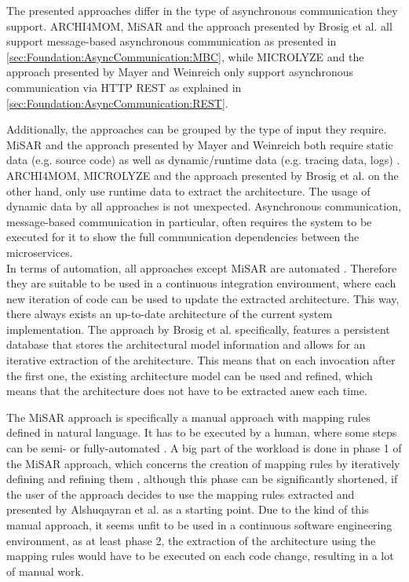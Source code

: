 The presented approaches differ in the type of asynchronous communication they support.
ARCHI4MOM, MiSAR and the approach presented by Brosig et al. all support message-based asynchronous communication as presented in \autoref{sec:Foundation:AsyncCommunication:MBC}, while MICROLYZE and the approach presented by Mayer and Weinreich only support asynchronous communication via HTTP REST as explained in \autoref{sec:Foundation:AsyncCommunication:REST}.

Additionally, the approaches can be grouped by the type of input they require.
MiSAR and the approach presented by Mayer and Weinreich both require static data (e.g. source code) as well as dynamic/runtime data (e.g. tracing data, logs) \cite{Alshuqayran2018MiSAR,Mayer2018}.
ARCHI4MOM, MICROLYZE and the approach presented by Brosig et al. on the other hand, only use runtime data to extract the architecture.
The usage of dynamic data by all approaches is not unexpected.
Asynchronous communication, message-based communication in particular, often requires the system to be executed for it to show the full communication dependencies between the microservices. 
\\

In terms of automation, all approaches except MiSAR are automated \cite{Alshuqayran2018MiSAR,Singh2022ARCHI4MOM,Brosig2011,Mayer2018,Kleehaus2018}.
Therefore they are suitable to be used in a continuous integration environment, where each new iteration of code can be used to update the extracted architecture.
This way, there always exists an up-to-date architecture of the current system implementation.
The approach by Brosig et al. specifically, features a persistent database that stores the architectural model information \cite{Brosig2011} and allows for an iterative extraction of the architecture.
This means that on each invocation after the first one, the existing architecture model can be used and refined, which means that the architecture does not have to be extracted anew each time.

The MiSAR approach is specifically a manual approach with mapping rules defined in natural language.
It has to be executed by a human, where some steps can be semi- or fully-automated \cite{Alshuqayran2020Thesis}.
A big part of the workload is done in phase 1 of the MiSAR approach, which concerns the creation of mapping rules by iteratively defining and refining them \cite{Alshuqayran2018MiSAR}, although this phase can be significantly shortened, if the user of the approach decides to use the mapping rules extracted and presented by Alshuqayran et al. as a starting point.
Due to the kind of this manual approach, it seems unfit to be used in a continuous software engineering environment, as at least phase 2, the extraction of the architecture using the mapping rules would have to be executed on each code change, resulting in a lot of manual work.
\\

